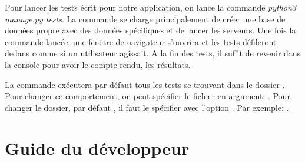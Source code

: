\documentclass[letterpaper,10pt,oneside]{sphinxmanual}
\begin{document}
Pour lancer les tests écrit pour notre application, on lance la commande \emph{python3 manage.py tests}. La commande se charge principalement de créer une base de données propre avec des données spécifiques et de lancer les serveurs. Une fois la commande lancée, une fenêtre de navigateur s'ouvrira et les tests défileront dedans comme si un utilisateur agissait. A la fin des tests, il suffit de revenir dans la console pour avoir le compte-rendu, les résultats.

La commande exécutera par défaut tous les tests se trouvant dans le dossier . Pour changer ce comportement, on peut spécifier le fichier en argument: . Pour changer le dossier, par défaut , il faut le spécifier avec l'option . Par exemple: .


\chapter{Guide du développeur}
\label{guide:guide-du-developpeur}\label{guide::doc}
\end{document}
